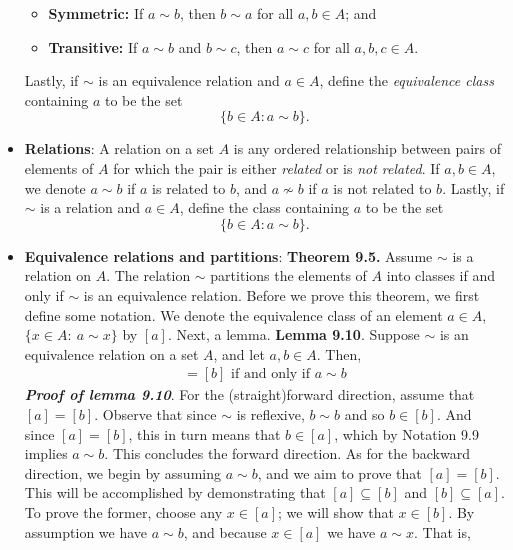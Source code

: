 \documentclass{report}
\begin{document}
\begin{itemize}
\begin{itemize}
                \item \textbf{Symmetric:} If \( a \sim b \), then \( b \sim a \) for all \( a, b \in A \); and
                \item \textbf{Transitive:} If \( a \sim b \) and \( b \sim c \), then \( a \sim c \) for all \( a, b, c \in A \).
            \end{itemize}
            Lastly, if \( \sim \) is an equivalence relation and \( a \in A \), define the \emph{equivalence class} containing \( a \) to be the set
            \[
                \{ b \in A : a \sim b \}.
            \] 
        \item \textbf{Relations}: A relation on a set \( A \) is any ordered relationship between pairs of elements of \( A \) for which the pair is either \emph{related} or is \emph{not related}. If \( a, b \in A \), we denote \( a \sim b \) if \( a \) is related to \( b \), and \( a \not\sim b \) if \( a \) is not related to \( b \).
            \bigbreak \noindent 
            Lastly, if \( \sim \) is a relation and \( a \in A \), define the class containing \( a \) to be the set
            \[
                \{ b \in A : a \sim b \}.
            \]
        \item \textbf{Equivalence relations and partitions}:
            \bigbreak \noindent 
            \textbf{Theorem 9.5.} Assume $\sim$ is a relation on $A$. The relation $\sim$ partitions the elements of $A$ into classes if and only if $\sim$ is an equivalence relation.
            \bigbreak \noindent 
            Before we prove this theorem, we first define some notation. We denote the equivalence class of an element $a\in A$, $\{x\in A:\ a \sim x\} $ by $[a]$. 
            \bigbreak \noindent 
            Next, a lemma.
            \bigbreak \noindent 
            \textbf{Lemma 9.10}. Suppose $\sim$ is an equivalence relation on a set $A$, and let $a, b \in A$. Then,
            \begin{align*}
                [a] = [b] \text{ if and only if } a\sim b
            \end{align*}
            \bigbreak \noindent 
            \textbf{\textit{Proof of lemma 9.10}}. For the (straight)forward direction, assume that \([a] = [b]\). Observe that since \( \sim \) is reflexive, \( b \sim b \) and so \( b \in [b] \). And since \([a] = [b]\), this in turn means that \( b \in [a] \), which by Notation 9.9 implies \( a \sim b \). This concludes the forward direction.
            \bigbreak \noindent 
            As for the backward direction, we begin by assuming \( a \sim b \), and we aim to prove that \([a] = [b]\). This will be accomplished by demonstrating that \([a] \subseteq [b]\) and \([b] \subseteq [a]\). To prove the former, choose any \( x \in [a] \); we will show that \( x \in [b] \). By assumption we have \( a \sim b \), and because \( x \in [a] \) we have \( a \sim x \). That is,

\end{itemize}
\end{document}
